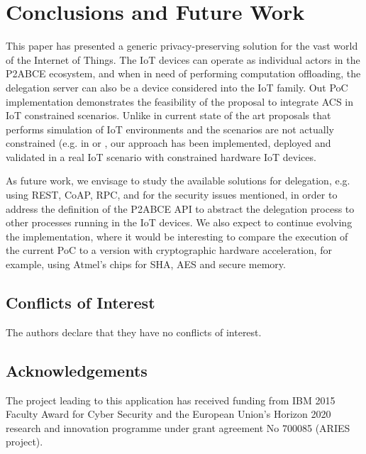 \section{Conclusions and Future Work}\label{ch:conclusions}

This paper has presented a generic privacy-preserving solution for the vast world of the Internet of Things. The IoT devices can operate as individual actors in the P2ABCE ecosystem, and when in need of performing computation offloading, the delegation server can also be a device considered into the IoT family.
Out PoC implementation demonstrates the feasibility of the proposal to integrate ACS in IoT constrained scenarios. Unlike in current state of the art proposals that performs simulation of IoT environments and the scenarios are not actually constrained (e.g. in \cite{vanet} or \cite{alcaide2013anonymous}, our approach has been implemented, deployed and validated in a real IoT scenario with constrained hardware IoT devices.

As future work, we envisage to study the available solutions for delegation, e.g. using REST, CoAP, RPC, and for the security issues mentioned, in order to address the definition of the P2ABCE API to abstract the delegation process to other processes running in the IoT devices. 
We also expect to continue evolving the implementation, where it would be interesting to compare the execution of the current PoC to a version with cryptographic hardware acceleration, for example, using Atmel's chips for SHA, AES and secure memory.



\subsection*{Conflicts of Interest}

The authors declare that they have no conflicts of interest.

\subsection*{Acknowledgements}

The project leading to this application has received funding from IBM 2015 Faculty Award for Cyber Security and the European Union’s Horizon 2020 research and innovation programme under grant agreement No 700085 (ARIES project).
